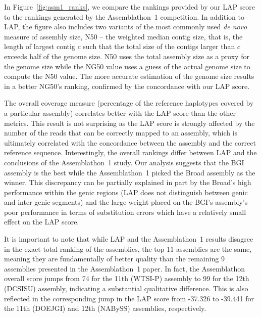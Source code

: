 \documentclass[12pt,\mydriver]{thesis}
\begin{document}
In Figure~\ref{fig:asm1_ranks}, we compare the rankings provided by our
LAP score to the rankings generated by the Assemblathon~1
competition. In addition to LAP, the figure also includes two variants
of the most commonly used \emph{de novo} measure of assembly size, N50
-- the weighted median contig size, that is, the length of largest contig $c$ such
that the total size of the contigs larger than $c$ exceeds half of the genome
size.  N50 uses the total assembly size as a proxy
for the genome size while the NG50 value uses a guess of the actual
genome size to compute the N50 value.  The more accurate estimation of the
genome size results in a better NG50's ranking, confirmed by the concordance with our LAP score.

The overall coverage measure (percentage of the reference haplotypes
covered by a particular assembly) correlates better with the LAP
score than the other metrics. This result is not surprising as the LAP score is strongly
affected by the number of the reads that can be correctly mapped to an
assembly, which is ultimately correlated with the concordance between
the assembly and the correct reference sequence.  Interestingly, the
overall rankings differ between LAP and the conclusions of the
Assemblathon~1 study.  Our analysis suggests that the BGI assembly is the best while the Assemblathon~1 picked the Broad
assembly as the winner.  This discrepancy can be partially explained in part by
the Broad's high performance within the genic regions (LAP does not
distinguish between genic and inter-genic segments) and the large
weight placed on the BGI's assembly's poor performance in terms of
substitution errors which have a relatively small effect on the LAP
score.

It is important to note that while LAP and the Assemblathon~1 results
disagree in the exact total ranking of the assemblies, the top 11 assemblies are
the same, meaning they are fundamentally of better quality than the
remaining 9 assemblies presented in the Assemblathon~1 paper.  In
fact, the Assemblathon overall score jumps from 74 for the 11th (WTSI-P)
assembly to 99 for the 12th (DCSISU) assembly, indicating a substantial qualitative
difference.  This is also reflected in the corresponding jump in the LAP score
from -37.326 to -39.441 for the 11th (DOEJGI) and 12th
(NABySS) assemblies, respectively.
\end{document}
